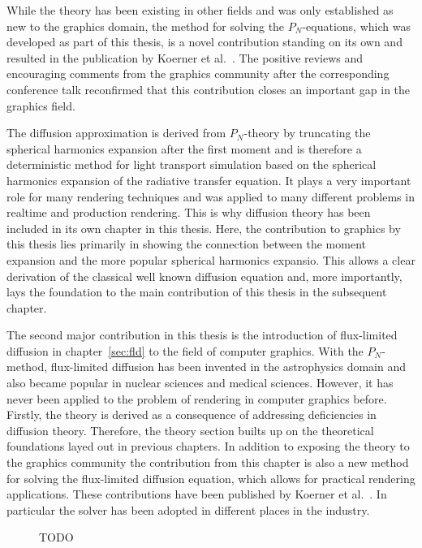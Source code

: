 While the theory has been existing in other fields and was only established as new to the graphics domain, the method for solving the $P_N$-equations, which was developed as part of this thesis, is a novel contribution standing on its own and resulted in the publication by Koerner et al.~\cite{Koerner18}. The positive reviews and encouraging comments from the graphics community after the corresponding conference talk reconfirmed that this contribution closes an important gap in the graphics field.

The diffusion approximation is derived from $P_N$-theory by truncating the spherical harmonics expansion after the first moment and is therefore a deterministic method for light transport simulation based on the spherical harmonics expansion of the radiative transfer equation. It plays a very important role for many rendering techniques and was applied to many different problems in realtime and production rendering. This is why diffusion theory has been included in its own chapter in this thesis. Here, the contribution to graphics by this thesis lies primarily in showing the connection between the moment expansion and the more popular spherical harmonics expansio. This allows a clear derivation of the classical well known diffusion equation and, more importantly, lays the foundation to the main contribution of this thesis in the subsequent chapter.

The second major contribution in this thesis is the introduction of flux-limited diffusion in chapter~\ref{sec:fld} to the field of computer graphics. With the $P_N$-method, flux-limited diffusion has been invented in the astrophysics domain and also became popular in nuclear sciences and medical sciences. However, it has never been applied to the problem of rendering in computer graphics before. Firstly, the theory is derived as a consequence of addressing deficiencies in diffusion theory. Therefore, the theory section builts up on the theoretical foundations layed out in previous chapters. In addition to exposing the theory to the graphics community the contribution from this chapter is also a new method for solving the flux-limited diffusion equation, which allows for practical rendering applications. These contributions have been published by Koerner et al.~\cite{Koerner14}. In particular the solver has been adopted in different places in the industry.
\begin{figure}[h]
\centering
{}
\caption{TODO}
\label{fig:fld_conclusion_elementacular_1}
\end{figure}

